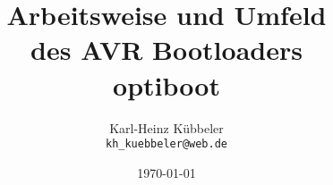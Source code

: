\documentclass[pdftex,12pt,a4paper,oneside,english]{report}
\begin{document}
\title{Arbeitsweise und Umfeld\\
des AVR Bootloaders \\
 optiboot\\
}
\author{Karl-Heinz Kübbeler\\
\texttt{kh\_kuebbeler@web.de}}
\date{\today}

\maketitle
\tableofcontents










\end{document}
